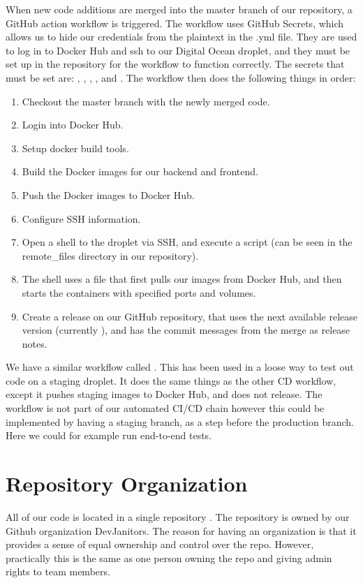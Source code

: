 When new code additions are merged into the master branch of our repository, a GitHub action workflow  is triggered. The workflow uses GitHub Secrets, which allows us to hide our credentials from the plaintext in the .yml file. They are used to log in to Docker Hub and ssh to our Digital Ocean droplet, and they must be set up in the repository for the workflow to function correctly. The secrets that must be set are: , , , , and . The workflow then does the following things in order:

\begin{enumerate}
    \item Checkout the master branch with the newly merged code.
    \item Login into Docker Hub.
    \item Setup docker build tools.
    \item Build the Docker images for our backend and frontend.
    \item Push the Docker images to Docker Hub.
    \item Configure SSH information.
    \item Open a shell to the droplet via SSH, and execute a script  (can be seen in the remote\_files directory in our repository).
    \item The shell uses a  file that first pulls our images from Docker Hub, and then starts the containers with specified ports and volumes.
    \item Create a release on our GitHub repository, that uses the next available release version (currently ), and has the commit messages from the merge as release notes.
\end{enumerate}

We have a similar workflow called . This has been used in a loose way to test out code on a staging droplet. It does the same things as the other \gls{CD} workflow, except it pushes staging images to Docker Hub, and does not release. The workflow is not part of our automated \gls{CI}/\gls{CD} chain however this could be implemented by having a staging branch, as a step before the production branch. Here we could for example run end-to-end tests.

\section{Repository Organization}
All of our code is located in a single repository . The repository is owned by our Github organization DevJanitors. The reason for having an organization is that it provides a sense of equal ownership and control over the repo. However, practically this is the same as one person owning the repo and giving admin rights to team members.\\

